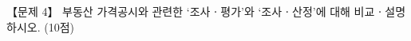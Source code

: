 \begin{longquestion}{【문제 4】}
부동산 가격공시와 관련한 ‘조사ㆍ평가’와 ‘조사ㆍ산정’에 대해 비교ㆍ설명하시오. (10점) \par
\end{longquestion}
